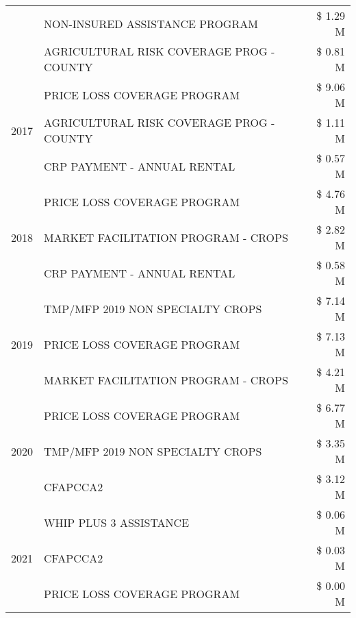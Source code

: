 \begin{tabular}{llr}
 & NON-INSURED ASSISTANCE PROGRAM                & \$ 1.29 M \\
 & AGRICULTURAL RISK COVERAGE PROG - COUNTY      & \$ 0.81 M \\
\cline{1-3}
\multirow[t]{3}{*}{2017} & PRICE LOSS COVERAGE PROGRAM & \$ 9.06 M \\
 & AGRICULTURAL RISK COVERAGE PROG - COUNTY & \$ 1.11 M \\
 & CRP PAYMENT - ANNUAL RENTAL & \$ 0.57 M \\
\cline{1-3}
\multirow[t]{3}{*}{2018} & PRICE LOSS COVERAGE PROGRAM & \$ 4.76 M \\
 & MARKET FACILITATION PROGRAM - CROPS & \$ 2.82 M \\
 & CRP PAYMENT - ANNUAL RENTAL & \$ 0.58 M \\
\cline{1-3}
\multirow[t]{3}{*}{2019} & TMP/MFP 2019 NON SPECIALTY CROPS & \$ 7.14 M \\
 & PRICE LOSS COVERAGE PROGRAM & \$ 7.13 M \\
 & MARKET FACILITATION PROGRAM - CROPS & \$ 4.21 M \\
\cline{1-3}
\multirow[t]{3}{*}{2020} & PRICE LOSS COVERAGE PROGRAM & \$ 6.77 M \\
 & TMP/MFP 2019 NON SPECIALTY CROPS & \$ 3.35 M \\
 & CFAPCCA2 & \$ 3.12 M \\
\cline{1-3}
\multirow[t]{3}{*}{2021} & WHIP PLUS 3 ASSISTANCE & \$ 0.06 M \\
 & CFAPCCA2 & \$ 0.03 M \\
 & PRICE LOSS COVERAGE PROGRAM & \$ 0.00 M \\
\cline{1-3}
\bottomrule
\end{tabular}
